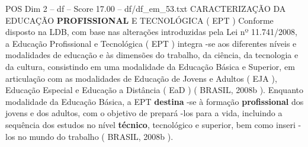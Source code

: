 \begin{textsample}{POS Dim 2 – df – Score 17.00 – df/df\_em\_53.txt}  \label{ex:f2_pos_130}
CARACTERIZAÇÃO DA EDUCAÇÃO \textbf{PROFISSIONAL} E TECNOLÓGICA ( EPT ) Conforme disposto na LDB, com base nas alterações introduzidas pela Lei nº 11.741/2008, a Educação Profissional e Tecnológica ( EPT ) integra -se aos diferentes níveis e modalidades de educação e às dimensões do trabalho, da ciência, da tecnologia e da cultura, consistindo em uma modalidade da Educação Básica e Superior, em articulação com as modalidades de Educação de Jovens e Adultos ( EJA ), Educação Especial e Educação a Distância ( EaD ) ( BRASIL, 2008b ).
Enquanto modalidade da Educação Básica, a EPT \textbf{destina} -se à formação \textbf{profissional} dos jovens e dos adultos, com o objetivo de prepará -los para a vida, incluindo a sequência dos estudos no nível \textbf{técnico}, tecnológico e superior, bem como inseri -los no mundo do trabalho ( BRASIL, 2008b ).

\end{textsample}
